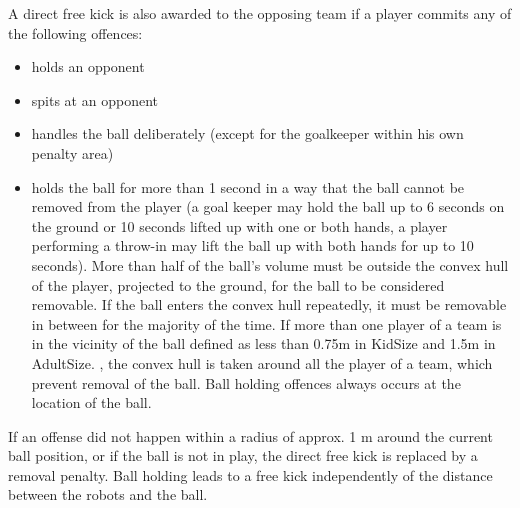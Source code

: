 
\bigskip


A direct free kick is also awarded to the opposing team if a player commits
any of the following %
offences:

\begin{itemize}
\item holds an opponent
\item spits at an opponent
\item handles the ball deliberately
    (except for the goalkeeper within his own penalty area)
\item {}holds the ball for more than 1 second in a way that the
  ball cannot be removed from the player (a goal keeper may hold the ball up to
  6 seconds on the ground or 10 seconds lifted up with one or both hands,
    a player performing a throw-in may lift the ball up with both hands
    for up to 10 seconds). More than half of the ball's volume must be outside
  the convex hull of the player, projected to the ground, for the ball to be
  considered removable. If the ball enters the convex hull repeatedly, it must
  be removable in between for the majority of the time. If more than one player
  of a team is in the vicinity of the ball
    defined as less than 0.75m in KidSize and 1.5m in AdultSize.
  , the convex hull is taken around all
  the player of a team, which prevent removal of the ball.
  Ball holding offences always occurs at the location of the ball.
\end{itemize}

\bigskip

If an offense did not happen within a radius of approx. 1 m
around the current ball position, or if the ball is not in play,
the direct free kick is replaced by a removal penalty.
Ball holding leads to a free kick independently of the distance between
  the robots and the ball.

